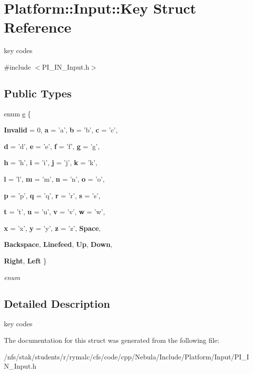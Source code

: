 \hypertarget{structPlatform_1_1Input_1_1Key}{
\section{Platform::Input::Key Struct Reference}
\label{structPlatform_1_1Input_1_1Key}
}


key codes  


{\ttfamily \#include $<$PI\_\-IN\_\-Input.h$>$}\subsection*{Public Types}
\begin{DoxyCompactItemize}
\item 
enum \hyperlink{structPlatform_1_1Input_1_1Key_a31dc4150941ad67f367a35f3bf5da71f}{e} \{ \par
{\bfseries Invalid} =  0, 
{\bfseries a} =  'a', 
{\bfseries b} =  'b', 
{\bfseries c} =  'c', 
\par
{\bfseries d} =  'd', 
{\bfseries e} =  'e', 
{\bfseries f} =  'f', 
{\bfseries g} =  'g', 
\par
{\bfseries h} =  'h', 
{\bfseries i} =  'i', 
{\bfseries j} =  'j', 
{\bfseries k} =  'k', 
\par
{\bfseries l} =  'l', 
{\bfseries m} =  'm', 
{\bfseries n} =  'n', 
{\bfseries o} =  'o', 
\par
{\bfseries p} =  'p', 
{\bfseries q} =  'q', 
{\bfseries r} =  'r', 
{\bfseries s} =  's', 
\par
{\bfseries t} =  't', 
{\bfseries u} =  'u', 
{\bfseries v} =  'v', 
{\bfseries w} =  'w', 
\par
{\bfseries x} =  'x', 
{\bfseries y} =  'y', 
{\bfseries z} =  'z', 
{\bfseries Space}, 
\par
{\bfseries Backspace}, 
{\bfseries Linefeed}, 
{\bfseries Up}, 
{\bfseries Down}, 
\par
{\bfseries Right}, 
{\bfseries Left}
 \}
\begin{DoxyCompactList}\small\item\em enum \item\end{DoxyCompactList}\end{DoxyCompactItemize}


\subsection{Detailed Description}
key codes 

The documentation for this struct was generated from the following file:\begin{DoxyCompactItemize}
\item 
/nfs/stak/students/r/rymalc/cfs/code/cpp/Nebula/Include/Platform/Input/PI\_\-IN\_\-Input.h\end{DoxyCompactItemize}

